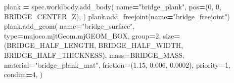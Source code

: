 \documentclass[
  chinese,
  11pt,
  letterpaper,
]{article}
\newenvironment{Shaded}{\begin{snugshade}}{\end{snugshade}}
\newcommand{\BuiltInTok}[1]{#1}
\newcommand{\DecValTok}[1]{\textcolor[rgb]{0.00,0.00,0.81}{#1}}
\newcommand{\FloatTok}[1]{\textcolor[rgb]{0.00,0.00,0.81}{#1}}
\newcommand{\NormalTok}[1]{#1}
\newcommand{\OperatorTok}[1]{\textcolor[rgb]{0.81,0.36,0.00}{\textbf{#1}}}
\newcommand{\StringTok}[1]{\textcolor[rgb]{0.31,0.60,0.02}{#1}}
\renewenvironment{Shaded}{\par\smallskip}{\par\smallskip}
\begin{document}
\begin{Shaded}
\begin{Highlighting}[]
\NormalTok{    plank }\OperatorTok{=}\NormalTok{ spec.worldbody.add\_body(}
\NormalTok{        name}\OperatorTok{=}\StringTok{"bridge\_plank"}\NormalTok{,}
\NormalTok{        pos}\OperatorTok{=}\NormalTok{(}\DecValTok{0}\NormalTok{, }\DecValTok{0}\NormalTok{, BRIDGE\_CENTER\_Z),}
\NormalTok{    )}
\NormalTok{    plank.add\_freejoint(name}\OperatorTok{=}\StringTok{"bridge\_freejoint"}\NormalTok{)}
\NormalTok{    plank.add\_geom(}
\NormalTok{        name}\OperatorTok{=}\StringTok{"bridge\_surface"}\NormalTok{,}
        \BuiltInTok{type}\OperatorTok{=}\NormalTok{mujoco.mjtGeom.mjGEOM\_BOX,}
\NormalTok{        group}\OperatorTok{=}\DecValTok{2}\NormalTok{,}
\NormalTok{        size}\OperatorTok{=}\NormalTok{(BRIDGE\_HALF\_LENGTH, BRIDGE\_HALF\_WIDTH, BRIDGE\_HALF\_THICKNESS),}
\NormalTok{        mass}\OperatorTok{=}\NormalTok{BRIDGE\_MASS,}
\NormalTok{        material}\OperatorTok{=}\StringTok{"bridge\_plank\_mat"}\NormalTok{,}
\NormalTok{        friction}\OperatorTok{=}\NormalTok{(}\FloatTok{1.15}\NormalTok{, }\FloatTok{0.006}\NormalTok{, }\FloatTok{0.0002}\NormalTok{),}
\NormalTok{        priority}\OperatorTok{=}\DecValTok{1}\NormalTok{,}
\NormalTok{        condim}\OperatorTok{=}\DecValTok{4}\NormalTok{,}
\NormalTok{    )}


\end{Highlighting}
\end{Shaded}
\end{document}
